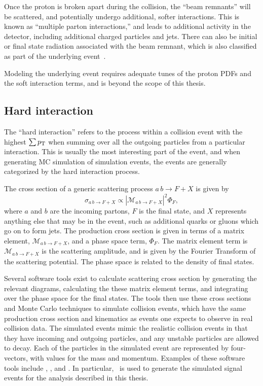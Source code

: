 Once the proton is broken apart during the collision, the ``beam remnants''
will be scattered, and potentially undergo additional, softer interactions.
This is known as ``multiple parton interactions,'' and leads to additional
activity in the detector, including additional charged particles and jets.
There can also be initial or final state radiation associated with the
beam remnant, which is also classified as part of the underlying
event~\cite{Field:2002vt}.

Modeling the underlying event requires adequate tunes of the proton PDFs
and the soft interaction terms, and is beyond the scope of this thesis.

\FloatBarrier
\subsection{Hard interaction}
\label{sec:matrix_element}

The ``hard interaction'' refers to the process within a collision event
with the highest $\sum p_{\mathrm{T}}$ when summing over all the outgoing particles
from a particular interaction.
This is usually the most interesting part of the event, and when generating
MC simulation of simulation events, the events are generally categorized by
the hard interaction process.

The cross section of a generic scattering process $a\,b \to F+X$ is given by
\begin{equation}
  \sigma_{a\,b \to F+X} \propto
  \left|\mathcal{M}_{a\,b \to F+X}\right|^2 \Phi_{F},
\end{equation}
where $a$ and $b$ are the incoming partons, $F$ is the final state, and $X$
represents anything else that may be in the event, such as additional quarks or
gluons which go on to form jets.
The production cross section is given in terms of a matrix
element, $\mathcal{M}_{a\,b \to F+X}$, and a phase space term, $\Phi_F$.
The matrix element term is $\mathcal{M}_{a\,b \to F+X}$ is the scattering
amplitude, and is given by the Fourier Transform of the scattering potential.
The phase space is related to the density of final states.

Several software tools exist to calculate scattering cross section by
generating the relevant diagrams, calculating the these matrix element terms,
and integrating over the phase space for the final states.
The tools then use these cross sections and Monte Carlo techniques to simulate
collision events, which have the same production cross section and kinematics
as events one expects to observe in real collision data.
The simulated events mimic the realistic collision events in that they have
incoming and outgoing particles, and any unstable particles are allowed to
decay.
Each of the particles in the simulated event are represented by four-vectors,
with values for the mass and momentum.
Examples of these software tools include \sherpa, \powheg, and \madgraph.
In particular, \madgraph\ is used to generate the simulated signal events for
the analysis described in this thesis.

